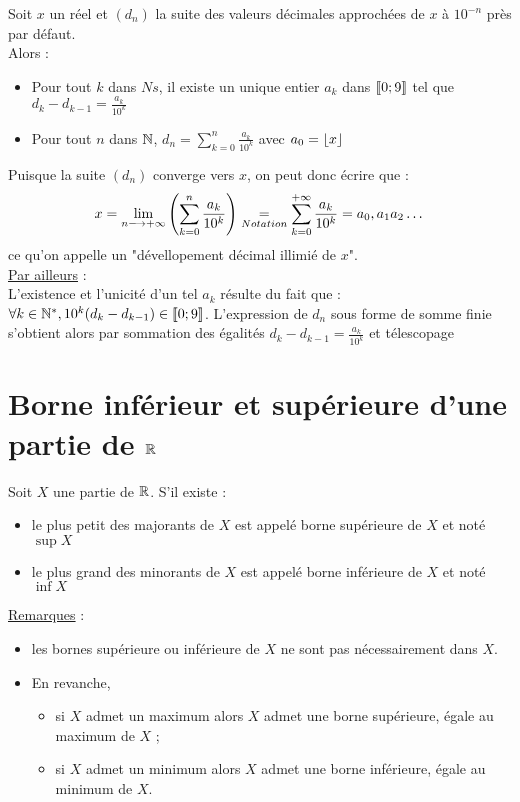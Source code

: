 \begin{defprop}
    Soit \(x\) un réel et \((d_n)\) la suite des valeurs décimales approchées de \(x\) à \(10^{-n}\) près par défaut. \\
    Alors :
    \begin{itemize}
        \item Pour tout \(k\) dans \(Ns\), il existe un unique entier \(a_k\) dans \(\left\llbracket0;9\right\rrbracket \) tel que \(d_k-d_{k-1} = \frac{a_k}{10^k}\) \\
        \item Pour tout \(n\) dans \(\mathbb{N}\), \(d_n = \sum_{k=0}^{n} \frac{a_k}{10^k}\) avec \(a_0 = \left\lfloor x\right\rfloor\)
    \end{itemize}
    Puisque la suite \((d_n)\) converge vers \(x\), on peut donc écrire que :   
    \[x = \lim_{n\longrightarrow+\infty} \left(\sum_{k=0}^{n} \frac{a_k}{10^k}\right) \underset{Notation}{=} \sum_{k=0}^{+\infty} \frac{a_k}{10^k} = a_0,a_1a_2\dots\]
    ce qu'on appelle un "dévellopement décimal illimié de \(x\)". \\
    \underline{Par ailleurs} : \\
    L’existence et l’unicité d’un tel \(a_k\) résulte du fait que : \(\forall k \in \mathbb{N}^*, 10^k (d_k - d_{k-1}) \in \left\llbracket0;9\right\rrbracket\). L’expression de \(d_n\) sous forme de somme finie s’obtient alors par sommation des égalités \(d_k - d_{k-1} =\frac{a_k}{10^k} \) et télescopage
\end{defprop}

\section{Borne inférieur et supérieure d'une partie de \(\mathbb{R}\)}

\begin{defi}
    Soit \(X\) une partie de \(\mathbb{R}\). S'il existe :
    \begin{itemize}
        \item le plus petit des majorants de \(X\) est appelé borne supérieure de \(X\) et noté \(\sup X\)
        \item le plus grand des minorants de \(X\) est appelé borne inférieure de \(X\) et noté \(\inf X\)
    \end{itemize}
    \underline{Remarques} : \\
    \begin{itemize}
        \item les bornes supérieure ou inférieure de \(X\) ne sont pas nécessairement dans \(X\).
        \item En revanche,
        \begin{itemize}
            \item si \(X\) admet un maximum alors \(X\) admet une borne supérieure, égale au maximum de \(X\) ;
            \item si \(X\) admet un minimum alors \(X\) admet une borne inférieure, égale au minimum de \(X\).
        \end{itemize}

    \end{itemize}
\end{defi}

